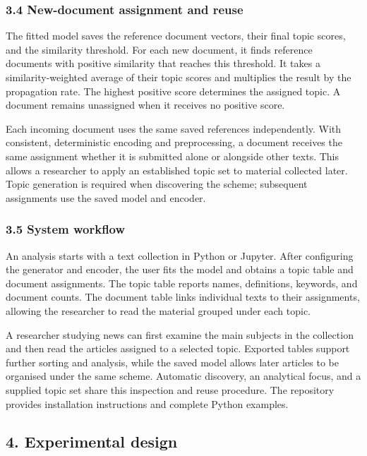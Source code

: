 \documentclass[
  11pt,
  a4paper,
]{article}
\begin{document}
\subsubsection{3.4 New-document assignment and
reuse}\label{new-document-assignment-and-reuse}

The fitted model saves the reference document vectors, their final topic
scores, and the similarity threshold. For each new document, it finds
reference documents with positive similarity that reaches this
threshold. It takes a similarity-weighted average of their topic scores
and multiplies the result by the propagation rate. The highest positive
score determines the assigned topic. A document remains unassigned when
it receives no positive score.

Each incoming document uses the same saved references independently.
With consistent, deterministic encoding and preprocessing, a document
receives the same assignment whether it is submitted alone or alongside
other texts. This allows a researcher to apply an established topic set
to material collected later. Topic generation is required when
discovering the scheme; subsequent assignments use the saved model and
encoder.

\subsubsection{3.5 System workflow}\label{system-workflow}

An analysis starts with a text collection in Python or Jupyter. After
configuring the generator and encoder, the user fits the model and
obtains a topic table and document assignments. The topic table reports
names, definitions, keywords, and document counts. The document table
links individual texts to their assignments, allowing the researcher to
read the material grouped under each topic.

A researcher studying news can first examine the main subjects in the
collection and then read the articles assigned to a selected topic.
Exported tables support further sorting and analysis, while the saved
model allows later articles to be organised under the same scheme.
Automatic discovery, an analytical focus, and a supplied topic set share
this inspection and reuse procedure. The repository provides
installation instructions and complete Python examples.

\subsection{4. Experimental design}\label{experimental-design}
\end{document}
